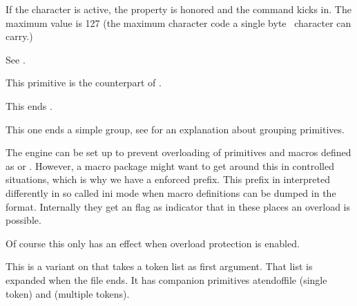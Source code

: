 \typebuffer

\start \getbuffer \stop

If the character is active, the property is honored and the command kicks in. The
maximum value is 127 (the maximum character code a single byte \UTF\ character
can carry.)

\stopoldprimitive

\startnewprimitive[title={\prm {endlocalcontrol}}]

See .

\stopnewprimitive

\startnewprimitive[title={\prm {endmathgroup}}]

This primitive is the counterpart of .

\stopnewprimitive

\startnewprimitive[title={\prm {endmvl}}]

This ends .

\stopnewprimitive

\startnewprimitive[title={\prm {endsimplegroup}}]

This one ends a simple group, see  for an explanation
about grouping primitives.

\stopnewprimitive

\startnewprimitive[title={\prm {enforced}}]

The engine can be set up to prevent overloading of primitives and macros defined
as  or . However, a macro package might want
to get around this in controlled situations, which is why we have a \prm
{enforced} prefix. This prefix in interpreted differently in so called \quote
{ini} mode when macro definitions can be dumped in the format. Internally they
get an  flag as indicator that in these places an overload is
possible.

\starttyping
\permanent{}

\def\oof         {\def\foo{fails}}
\def\oof{\enforced\def\foo{succeeds}}
\stoptyping

Of course this only has an effect when overload protection is enabled.

\stopnewprimitive

\startoldprimitive[title={\prm {eofinput}}]

This is a variant on  that takes a token list as first argument. That
list is expanded when the file ends. It has companion primitives \prm
{atendoffile} (single token) and  (multiple tokens).

